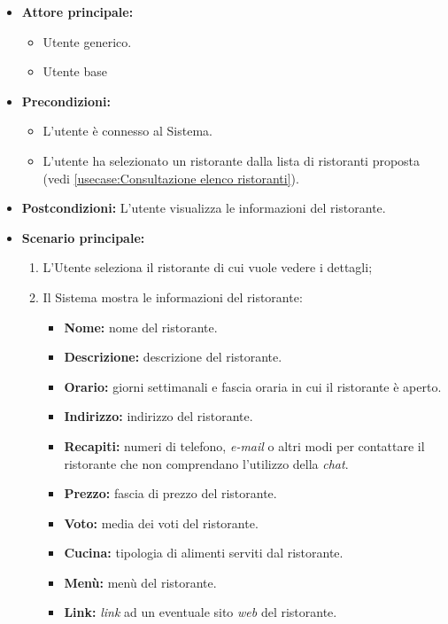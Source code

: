 \label{usecase:Visualizzazione di un ristorante}
\begin{itemize}
	\item \textbf{Attore principale:}    
	\begin{itemize}
        \item Utente generico.
        \item Utente base
    \end{itemize}

	\item \textbf{Precondizioni:}
	\begin{itemize}
        \item L'utente è connesso al Sistema.
        \item L'utente ha selezionato un ristorante dalla lista di ristoranti proposta (vedi \autoref{usecase:Consultazione elenco ristoranti}).
    \end{itemize}

	\item \textbf{Postcondizioni:} L'utente visualizza le informazioni del ristorante.

	\item \textbf{Scenario principale:}
		\begin{enumerate}
		    \item L'Utente seleziona il ristorante di cui vuole vedere i dettagli;
		    \item Il Sistema mostra le informazioni del ristorante:
		    \begin{itemize}
				\item \textbf{Nome:} nome del ristorante.
				\item \textbf{Descrizione:} descrizione del ristorante.
				\item \textbf{Orario:} giorni settimanali e fascia oraria in cui il ristorante è aperto.
				\item \textbf{Indirizzo:} indirizzo del ristorante.
				\item \textbf{Recapiti:} numeri di telefono, \textit{e-mail} o altri modi per contattare il ristorante che non comprendano l'utilizzo della \textit{chat}.
				\item \textbf{Prezzo:} fascia di prezzo del ristorante.
				\item \textbf{Voto:} media dei voti del ristorante.
				\item \textbf{Cucina:} tipologia di alimenti serviti dal ristorante.
				\item \textbf{Menù:} menù del ristorante.
				\item \textbf{Link:} \textit{link} ad un eventuale sito \textit{web} del ristorante. 
			\end{itemize}
	    \end{enumerate}

\end{itemize}
